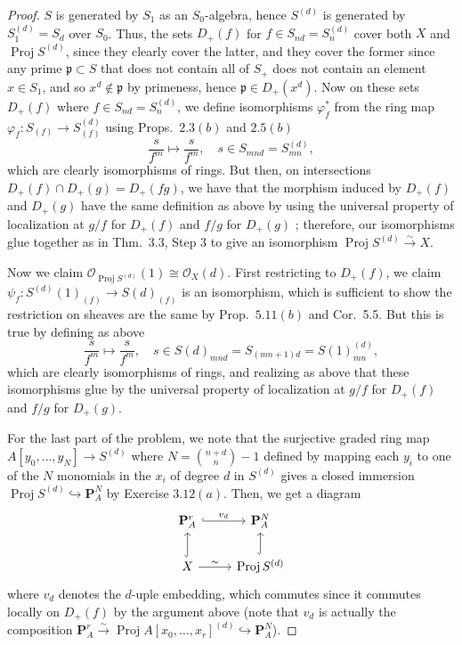 \documentclass[10pt]{article}
\theoremstyle{definition}
\theoremstyle{remark}
\numberwithin{equation}{section}
\numberwithin{figure}{subsubsection}
\DeclareMathOperator{\Proj}{Proj}
\newcommand{\OO}{\mathcal{O}}
\newcommand{\isoto}{\overset{\sim}{\to}}
\begin{document}
\begin{proof}
  $S$ is generated by $S_1$ as an $S_0$-algebra, hence $S^{(d)}$ is generated by $S_1^{(d)} = S_d$ over $S_0$. Thus, the sets $D_+(f)$ for $f \in S_{nd} = S_n^{(d)}$ cover both $X$ and $\Proj S^{(d)}$, since they clearly cover the latter, and they cover the former since any prime $\mathfrak{p} \subset S$ that does not contain all of $S_+$ does not contain an element $x \in S_1$, and so $x^{d} \notin \mathfrak{p}$ by primeness, hence $\mathfrak{p} \in D_+(x^d)$. Now on these sets $D_+(f)$ where $f \in S_{nd} = S_n^{(d)}$, we define isomorphisms $\varphi_f^*$ from the ring map $\varphi_f\colon S_{(f)} \to S^{(d)}_{(f)}$ using Props.~$2.3(b)$ and $2.5(b)$
  \begin{equation*}
    \frac{s}{f^m} \mapsto \frac{s}{f^m}, \quad s \in S_{mnd} = S_{mn}^{(d)},
  \end{equation*}
  which are clearly isomorphisms of rings. But then, on intersections $D_+(f) \cap D_+(g) = D_+(fg)$, we have that the morphism induced by $D_+(f)$ and $D_+(g)$ have the same definition as above by using the universal property of localization at $g/f$ for $D_+(f)$ and $f/g$ for $D_+(g)$ \cite[Prop.~3.1]{AM69}; therefore, our isomorphisms glue together as in Thm.~3.3, Step 3 to give an isomorphism $\Proj S^{(d)} \isoto X$.
  \par Now we claim $\OO_{\Proj S^{(d)}}(1) \cong \OO_X(d)$. First restricting to $D_+(f)$, we claim $\psi_f \colon S^{(d)}(1)_{(f)} \to S(d)_{(f)}$ is an isomorphism, which is sufficient to show the restriction on sheaves are the same by Prop.~$5.11(b)$ and Cor.~5.5. But this is true by defining as above
  \begin{equation*}
    \frac{s}{f^m} \mapsto \frac{s}{f^m}, \quad s \in S(d)_{mnd} = S_{(mn+1)d} = S(1)_{mn}^{(d)},
  \end{equation*}
  which are clearly isomorphisms of rings, and realizing as above that these isomorphisms glue by the universal property of localization at $g/f$ for $D_+(f)$ and $f/g$ for $D_+(g)$.
  \par For the last part of the problem, we note that the surjective graded ring
  map $A[y_0,\ldots,y_N] \to S^{(d)}$ where $N = \binom{n+d}{n} - 1$ defined by
  mapping each $y_i$ to one of the $N$ monomials in the $x_i$ of degree $d$ in
  $S^{(d)}$ gives a closed immersion $\Proj S^{(d)} \hookrightarrow
  \mathbf{P}^N_A$ by Exercise $3.12(a)$. Then, we get a diagram
  \begin{equation*}
    \begin{tikzcd}
      \mathbf{P}^r_A \rar[hook]{v_d} & \mathbf{P}^N_A\\
      X \rar{\sim} \uar[hook] & \Proj S^{(d)} \uar[hook]
    \end{tikzcd}
  \end{equation*}
  where $v_d$ denotes the $d$-uple embedding, which commutes since it commutes locally on $D_+(f)$ by the argument above (note that $v_d$ is actually the composition $\mathbf{P}^r_A \isoto \Proj A[x_0,\ldots,x_r]^{(d)} \hookrightarrow \mathbf{P}^N_A$).
\end{proof}
\end{document}
